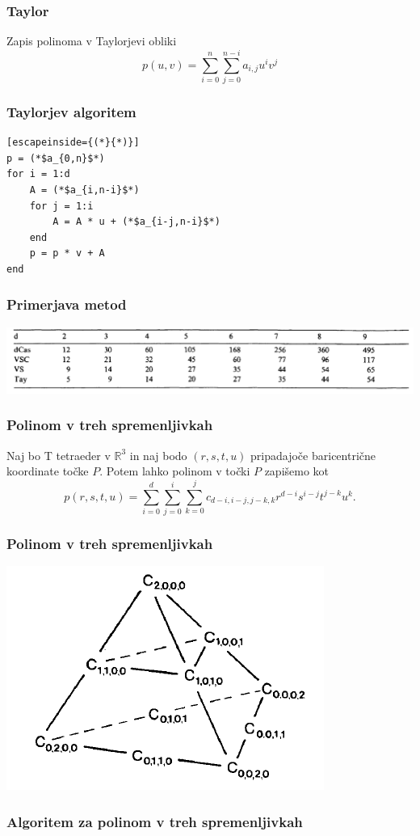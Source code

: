 \documentclass{beamer}
\begin{document}
\begin{frame}
\frametitle{Taylor}
Zapis polinoma v Taylorjevi obliki
$$p(u,v) = \sum_{i = 0}^n{\sum_{j=0}^{n-i}{a_{i,j}u^iv^j }}$$
\end{frame}



\begin{frame}[fragile]
\frametitle{Taylorjev algoritem}

\begin{lstlisting}[escapeinside={(*}{*)}]
p = (*$a_{0,n}$*)
for i = 1:d
    A = (*$a_{i,n-i}$*)
    for j = 1:i
        A = A * u + (*$a_{i-j,n-i}$*)
    end
    p = p * v + A
end
\end{lstlisting}


\end{frame}

\begin{frame}
\frametitle{Primerjava metod}

\begin{center}
\includegraphics[width=1.0\linewidth]{tabelca.PNG}
\end{center}


\end{frame}

\begin{frame}
\frametitle{Polinom v treh spremenljivkah}
Naj bo T tetraeder v $\mathbb{R}^3$ in naj bodo $(r,s,t,u)$ pripadajoče baricentrične koordinate točke $P$. Potem lahko polinom v točki $P$ zapišemo kot
$$p(r,s,t,u) = \sum_{i=0}^{d}\sum_{j=0}^{i}\sum_{k=0}^{j}c_{d-i,i-j,j-k,k}r^{d-i}s^{i-j}t^{j-k}u^{k}.$$
\end{frame}


\begin{frame}
\frametitle{Polinom v treh spremenljivkah}
\begin{center}
\includegraphics[width=0.7\linewidth]{tetraeder.PNG}
\end{center}
\end{frame}

\begin{frame}[fragile]
\frametitle{Algoritem za polinom v treh spremenljivkah}
\end{frame}
\end{document}
